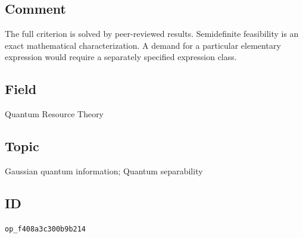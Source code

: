 \subsection*{Comment}

The full criterion is solved by peer-reviewed results. Semidefinite feasibility is an exact mathematical characterization. A demand for a particular elementary expression would require a separately specified expression class.

\subsection*{Field}

Quantum Resource Theory

\subsection*{Topic}

Gaussian quantum information; Quantum separability

\subsection*{ID}

\texttt{op\_f408a3c300b9b214}
